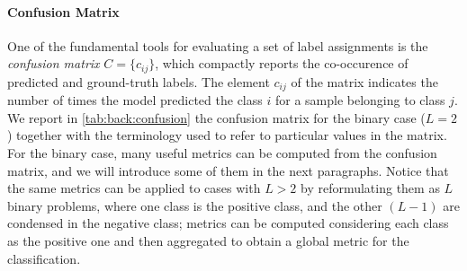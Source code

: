 \paragraph{Confusion Matrix}
One of the fundamental tools for evaluating a set of label assignments is the \emph{confusion matrix} $C = \{c_{ij}\}$, which compactly reports the co-occurence of predicted and ground-truth labels.
The element $c_{ij}$ of the matrix indicates the number of times the model predicted the class $i$ for a sample belonging to class $j$.
We report in \ref{tab:back:confusion} the confusion matrix for the binary case ($L=2$) together with the terminology used to refer to particular values in the matrix.
For the binary case, many useful metrics can be computed from the confusion matrix, and we will introduce some of them in the next paragraphs.
Notice that the same metrics can be applied to cases with $L > 2$ by reformulating them as $L$ binary problems, where one class is the positive class, and the other $(L-1)$ are condensed in the negative class;
metrics can be computed considering each class as the positive one and then aggregated to obtain a global metric for the classification.

